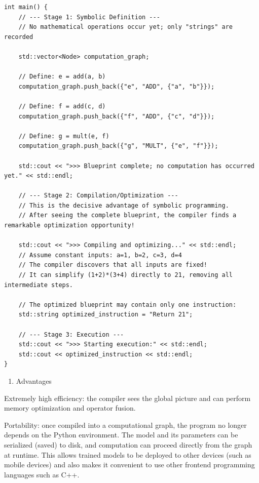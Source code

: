 \begin{verbatim}
int main() {
    // --- Stage 1: Symbolic Definition ---
    // No mathematical operations occur yet; only "strings" are recorded

    std::vector<Node> computation_graph;

    // Define: e = add(a, b)
    computation_graph.push_back({"e", "ADD", {"a", "b"}});

    // Define: f = add(c, d)
    computation_graph.push_back({"f", "ADD", {"c", "d"}});

    // Define: g = mult(e, f)
    computation_graph.push_back({"g", "MULT", {"e", "f"}});

    std::cout << ">>> Blueprint complete; no computation has occurred yet." << std::endl;

    // --- Stage 2: Compilation/Optimization ---
    // This is the decisive advantage of symbolic programming.
    // After seeing the complete blueprint, the compiler finds a remarkable optimization opportunity!

    std::cout << ">>> Compiling and optimizing..." << std::endl;
    // Assume constant inputs: a=1, b=2, c=3, d=4
    // The compiler discovers that all inputs are fixed!
    // It can simplify (1+2)*(3+4) directly to 21, removing all intermediate steps.

    // The optimized blueprint may contain only one instruction:
    std::string optimized_instruction = "Return 21";

    // --- Stage 3: Execution ---
    std::cout << ">>> Starting execution:" << std::endl;
    std::cout << optimized_instruction << std::endl;
}
\end{verbatim}

\begin{enumerate}
\def\labelenumi{(\arabic{enumi})}
\setcounter{enumi}{1}
\tightlist
\item
  Advantages
\end{enumerate}

Extremely high efficiency: the compiler sees the global picture and can perform memory optimization and operator fusion.

Portability: once compiled into a computational graph, the program no longer depends on the Python environment. The model and its parameters can be serialized (saved) to disk, and computation can proceed directly from the graph at runtime. This allows trained models to be deployed to other devices (such as mobile devices) and also makes it convenient to use other frontend programming languages such as C++.

